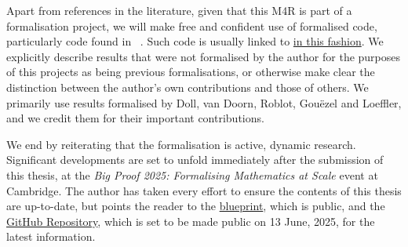 Apart from references in the literature, given that this M4R is part of a formalisation project, we will make free and confident use of formalised code, particularly code found in \mathlib\ \cite{mathlib}. Such code is usually linked to \href{https://github.com/leanprover-community/mathlib4}{in this fashion}. We explicitly describe results that were not formalised by the author for the purposes of this projects as being previous formalisations, or otherwise make clear the distinction between the author's own contributions and those of others. We primarily use results formalised by Doll, van Doorn, Roblot, Gouëzel and Loeffler, and we credit them for their important contributions.

We end by reiterating that the formalisation is active, dynamic research. Significant developments are set to unfold immediately after the submission of this thesis, at the \textit{Big Proof 2025: Formalising Mathematics at Scale} event at Cambridge. The author has taken every effort to ensure the contents of this thesis are up-to-date, but points the reader to the \href{https://thefundamentaltheor3m.github.io/Sphere-Packing-Lean/blueprint/index.html}{blueprint}, which is public, and the \href{https://github.com/thefundamentaltheor3m/Sphere-Packing-Lean}{GitHub Repository}, which is set to be made public on 13 June, 2025, for the latest information.

\begin{comment}
    Given the limitations of the M4R assessed project paradigm, the author decided, at the very beginning, to use the first three sections of Viazovska's paper as a black box in order to reduce the number-theoretic burden on what already stood ahead of me as a daunting formalisation task. In particular, the author chose not to make this M4R a number theory project with an element of formalisation but a formalisation project involving ideas from number theory and complex analysis. This conscious but deliberate decision illustrates one of the many advantages of formal theorem proving: modularity with assurances. That is, one need not understand the entirety of a project to contribute to it: one simply needs to understand the parts one is formalising and how to use other ideas and results to one's end. In particular, the fact that the results one is using are formalised provides one with the assurance (that would otherwise only come with expertise) that those results are, indeed, correct. By bearing in mind the subtle yet immensely important fact that this project, at its core, is not a number theory project but a formalisation project, the reader will better understand the expository choices made by the author over the course of this report. There will be less emphasis on the motivations for constructing Viazovska's magic function in this manner (for there exist numerous excellent expository articles that explain this in detail \cite{a few things}) and more emphasis on the formalisation process, with reflections on the successes and failures of the formalisation strategies employed. We underscore insights gleaned from doing this that were not evident in the paper, one one occasion even identifying a small (but negligible) error that was published in the Annals. 
\end{comment}
